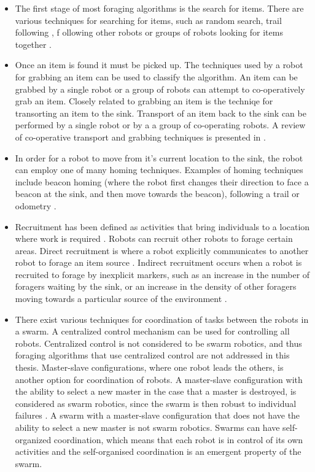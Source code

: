 \begin{itemize}
\item The first stage of most foraging algorithms is the search for items. There are various techniques for searching for items, such as random search, trail following \cite{schmickl2006trophallaxis}, f
ollowing other robots \cite{dorigo2013swarmanoid, werger1996robotic} or groups of robots looking for items together \cite{vincent2004framework}.

\item Once an item is found it must be picked up. The techniques used by a robot for grabbing an item can be used to classify the algorithm. An item can be grabbed by a single robot or a group of robots can attempt to co-operatively grab an item. Closely related to grabbing an item is the techniqe for transorting an item to the sink. Transport of an item back to the sink can be performed by a single robot or by a a group of co-operating robots. A review of co-operative transport and grabbing techniques is presented in \cite{kube2000cooperative}.

\item In order for a robot to move from it's current location to the sink, the robot can employ one of many homing techniques. Examples of homing techniques include beacon homing (where the robot first changes their direction to face a beacon at the sink, and then move towards the beacon), following a trail or odometry \cite{winfield2009towards}.

\item Recruitment has been defined as activities that bring individuals to a location where work is required \cite{holldobler1990ants}. Robots can recruit other robots to forage certain areas. Direct recruitment is where a robot explicitly communicates to another robot to forage an item source \cite{krieger2000ant,labella2006division}. Indirect recruitment occurs when a robot is recruited to forage by inexplicit markers, such as an increase in the number of foragers waiting by the sink, or an increase in the density of other foragers moving towards a particular source of the environment \cite{arkin1992cooperation}. 

\item There exist various techniques for coordination of tasks between the robots in a swarm. A centralized control mechanism can be used for controlling all robots. Centralized control is not considered to be swarm robotics, and thus foraging algorithms that use centralized control are not addressed in this thesis. Master-slave configurations, where one robot leads the others, is another option for coordination of robots. A master-slave configuration with the ability to select a new master in the case that a master is destroyed, is considered as swarm robotics, since the swarm is then robust to individual failures \cite{karpov2015leader, hoeing2007auction}. A swarm with a master-slave configuration that does not have the ability to select a new master is not swarm robotics. Swarms can have self-organized coordination, which means that each robot is in control of its own activities and the self-organised coordination is an emergent property of the swarm. %
\end{itemize}

